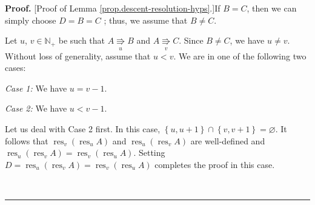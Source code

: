 \documentclass[numbers=enddot,12pt,final,onecolumn,notitlepage]{scrartcl}%
\theoremstyle{definition}
\newenvironment{proof}[1][Proof]{\noindent\textbf{#1.} }{\ \rule{0.5em}{0.5em}}
\begin{document}
\begin{proof}
[Proof of Lemma \ref{prop.descent-resolution-hyps}.]If $B=C$, then we can
simply choose $D=B=C$ ; thus, we assume that $B\neq C$.

Let $u$, $v \in\mathbb{N}_{+}$ be such that $A\underset{u}{\Rrightarrow}B$ and $A\underset{v}{\Rrightarrow}C$. Since $B \neq C$, we have $u \neq v$.
Without loss of generality, assume that $u<v$. We are in one of the following two cases:

\textit{Case 1:} We have $u=v-1$.

\textit{Case 2:} We have $u<v-1$.

Let us deal with Case 2 first. In this
case, $\left\{  u,u+1\right\}  \cap\left\{  v,v+1\right\}
=\varnothing$.
It follows that
$\operatorname*{res}\nolimits_{v}\left(  \operatorname*{res}\nolimits_{u}%
A\right)  $ and $\operatorname*{res}\nolimits_{u}%
\left(  \operatorname*{res}\nolimits_{v}A\right)  $ are well-defined and $\operatorname*{res}\nolimits_{u}\left(
\operatorname*{res}\nolimits_{v}A\right)  =\operatorname*{res}\nolimits_{v}%
\left(  \operatorname*{res}\nolimits_{u}A\right) $. Setting
$D=\operatorname*{res}\nolimits_{u}\left(  \operatorname*{res}\nolimits_{v}%
A\right)  =\operatorname*{res}\nolimits_{v}\left(  \operatorname*{res}%
\nolimits_{u}A\right)  $ completes the proof in this case.


\end{proof}
\end{document}
